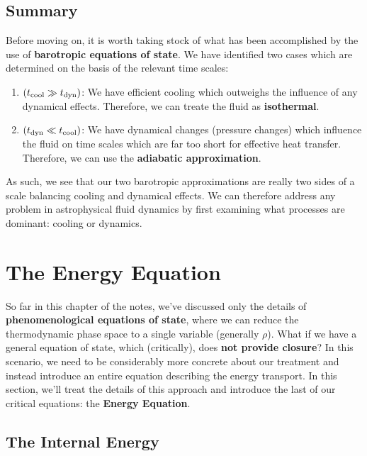 \subsection{Summary}

Before moving on, it is worth taking stock of what has been accomplished by the use of \textbf{barotropic equations of state}. We have identified two cases which are determined on the basis of the relevant time scales:
\begin{enumerate}
    \item $(t_{\rm cool} \gg t_{\rm dyn})$: We have efficient cooling which outweighs the influence of any dynamical effects. Therefore, we can treate the fluid as \textbf{isothermal}.
    \item $(t_{\rm dyn} \ll t_{\rm cool})$: We have dynamical changes (pressure changes) which influence the fluid on time scales which are far too short for effective heat transfer. Therefore, we can use the \textbf{adiabatic approximation}.
\end{enumerate}

As such, we see that our two barotropic approximations are really two sides of a scale balancing cooling and dynamical effects. We can therefore address any problem in astrophysical fluid dynamics by first examining what processes are dominant: cooling or dynamics.

\section{The Energy Equation}

So far in this chapter of the notes, we've discussed only the details of \textbf{phenomenological equations of state}, where we can reduce the thermodynamic phase space to a single variable (generally $\rho$). What if we have a general equation of state, which (critically), does \textbf{not provide closure}? In this scenario, we need to be considerably more concrete about our treatment and instead introduce an entire equation describing the energy transport. In this section, we'll treat the details of this approach and introduce the last of our critical equations: the \textbf{Energy Equation}.

\subsection{The Internal Energy}

